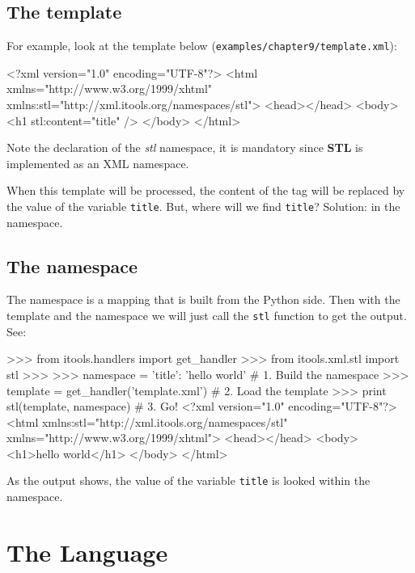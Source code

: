 \subsection{The template}

For example, look at the template below ({\tt examples/chapter9/template.xml}):

\begin{code}
    <?xml version="1.0" encoding="UTF-8"?>
    <html xmlns="http://www.w3.org/1999/xhtml"
          xmlns:stl="http://xml.itools.org/namespaces/stl">
      <head></head>
      <body>
        <h1 stl:content="title" />
      </body>
    </html>
\end{code}

Note the declaration of the {\em stl} namespace, it is mandatory since
{\bf STL} is implemented as an XML namespace.

When this template will be processed, the content of the {\tt <h1>} tag
will be replaced by the value of the variable {\tt title}. But, where will
we find {\tt title}? Solution: in the namespace.

\subsection{The namespace}

The namespace is a mapping that is built from the Python side. Then with
the template and the namespace we will just call the {\tt stl} function
to get the output. See:

\begin{code}
    >>> from itools.handlers import get_handler
    >>> from itools.xml.stl import stl
    >>>
    >>> namespace = {'title': 'hello world'}     # 1. Build the namespace
    >>> template = get_handler('template.xml')   # 2. Load the template
    >>> print stl(template, namespace)           # 3. Go!
    <?xml version="1.0" encoding="UTF-8"?>
    <html xmlns:stl="http://xml.itools.org/namespaces/stl"
          xmlns="http://www.w3.org/1999/xhtml">
      <head></head>
      <body>
        <h1>hello world</h1>
      </body>
    </html>
\end{code}

As the output shows, the value of the variable {\tt title} is looked within
the namespace.


\section{The Language}

